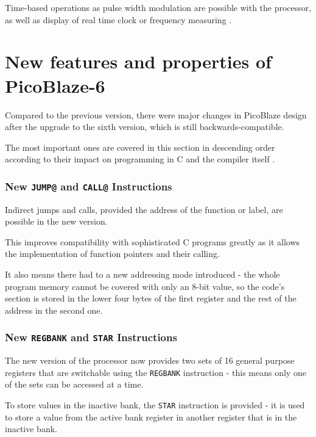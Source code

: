     Time-based operations as pulse width modulation are possible with the processor, as well as display of real time clock or frequency measuring \cite{PicoBlazeExamples}.

    \section{New features and properties of PicoBlaze-6}\label{kcpsm6cmp}

    Compared to the previous version, there were major changes in PicoBlaze design after the upgrade to the sixth version, which is still backwards-compatible.

    The most important ones are covered in this section in descending order according to their impact on programming in C and the compiler itself \cite{PicoBlaze6}.

        \subsubsection{New \texttt{JUMP@} and \texttt{CALL@} Instructions}\label{jumpat}

        Indirect jumps and calls, provided the address of the function or label, are possible in the new version.

        This improves compatibility with sophisticated C programs greatly as it allows the implementation of function pointers and their calling.

        It also means there had to a new addressing mode introduced - the whole program memory cannot be covered with only an 8-bit value, so the code's section is stored in the lower four bytes of the first register and the rest of the address in the second one.

        \subsubsection{New \texttt{REGBANK} and \texttt{STAR} Instructions}

        The new version of the processor now provides two sets of 16 general purpose registers that are switchable using the \texttt{REGBANK} instruction - this means only one of the sets can be accessed at a time.

        To store values in the inactive bank, the \texttt{STAR} instruction is provided - it is used to store a value from the active bank register in another register that is in the inactive bank.

